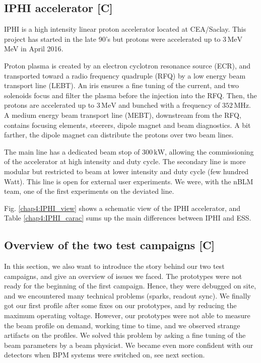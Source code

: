 \begin{refsection}
  \subsection{IPHI accelerator [C]}
  IPHI is a high intensity linear proton accelerator located at CEA/Saclay.
  This project has started in the late 90's\cite{Beau2000} but protons were accelerated up to $3\,\mathrm{MeV}$ MeV in April 2016\cite{Gobin2016}.

  Proton plasma is created by an electron cyclotron resonance source (ECR), and transported toward a radio frequency quadruple (RFQ) by a low energy beam transport line (LEBT).
  An iris ensures a fine tuning of the current, and two solenoids focus and filter the plasma before the injection into the RFQ.
  Then, the protons are accelerated up to $3\,\mathrm{MeV}$ and bunched with a frequency of $352\,\mathrm{MHz}$.
  A medium energy beam transport line (MEBT), downstream from the RFQ, contains focusing elements, steerers, dipole magnet and beam diagnostics.
  A bit farther, the dipole magnet can distribute the protons over two beam lines.

  

  The main line has a dedicated beam stop of $300\,\mathrm{kW}$, allowing the commissioning of the accelerator at high intensity and duty cycle.
  The secondary line is more modular but restricted to beam at lower intensity and duty cycle (few hundred Watt).
  This line is open for external user experiments.
  We were, with the nBLM team, one of the first experiments on the deviated line\cite{Senee:IPAC2018-TUPAF016}.

  Fig. \ref{chap4:IPHI_view} shows a schematic view of the IPHI accelerator, and Table \ref{chap4:IPHI_carac} sums up the main differences between IPHI and ESS.
  

  \subsection{Overview of the two test campaigns [C]}
  In this section, we also want to introduce the story behind our two test campaigns, and give an overview of issues we faced.
  The prototypes were not ready for the beginning of the first campaign.
  Hence, they were debugged on site, and we encountered many technical problems (sparks, readout sync).
  We finally got our first profile after some fixes on our prototypes, and by reducing the maximum operating voltage.
  However, our prototypes were not able to measure the beam profile on demand, working time to time, and we observed strange artifacts on the profiles.
  We solved this problem by asking a fine tuning of the beam parameters by a beam physicist.
  We became even more confident with our detectors when BPM systems were switched on, see next section.


\end{refsection}

